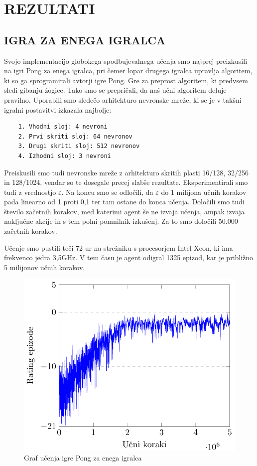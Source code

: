\documentclass[cover]{thesis}
\begin{document}
\chapter{REZULTATI}\label{section:results}

\section{IGRA ZA ENEGA IGRALCA}

Svojo implementacijo globokega spodbujevalnega učenja smo najprej preizkusili na igri Pong za enega igralca, pri čemer lopar drugega igralca upravlja algoritem, ki so ga sprogramirali avtorji igre Pong. Gre za preprost algoritem, ki predvsem sledi gibanju žogice. Tako smo se prepričali, da naš učni algoritem deluje pravilno. Uporabili smo sledečo arhitekturo nevronske mreže, ki se je v takšni igralni postavitvi izkazala najbolje:
\begin{verbatim}        
    1. Vhodni sloj: 4 nevroni
    2. Prvi skriti sloj: 64 nevronov
    3. Drugi skriti sloj: 512 nevronov
    4. Izhodni sloj: 3 nevroni
\end{verbatim}

Preiskusili smo tudi nevronske mreže z arhitekturo skritih plasti 16/128, 32/256 in 128/1024, vendar so te dosegale precej slabše rezultate. Eksperimentirali smo tudi z vrednostjo $\varepsilon$. Na koncu smo se odločili, da $\varepsilon$ do 1 milijona učnih korakov pada linearno od 1 proti 0,1 ter tam ostane do konca učenja. Določili smo tudi število začetnih korakov, med katerimi agent še ne izvaja učenja, ampak izvaja naključne akcije in s tem polni pomnilnik izkušenj. Za to smo določili 50.000 začetnih korakov.

Učenje smo pustili teči 72 ur na strežniku s procesorjem Intel Xeon, ki ima frekvenco jedra 3,5GHz. V tem času je agent odigral 1325 epizod, kar je približno 5 milijonov učnih korakov.

\begin{figure}[H]
    \centering
    \includegraphics{fig1.pdf}
    \caption{Graf učenja igre Pong za enega igralca}\label{fig:singleRating}
\end{figure}
\end{document}
